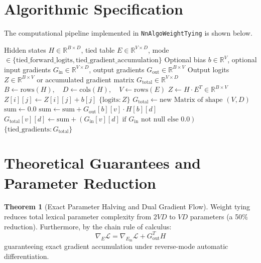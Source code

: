 \documentclass[11pt,a4paper]{article}
\theoremstyle{definition}
\newtheorem{theorem}{Theorem}[section]
\begin{document}
\section{Algorithmic Specification}

The computational pipeline implemented in \texttt{NnAlgoWeightTying} is shown below.

\begin{algorithm}[H]
\caption{Weight Tying Forward Projection and Tied Gradient Accumulation}
\begin{algorithmic}[1]
\Require Hidden states $H \in \mathbb{R}^{B \times D}$, tied table $E \in \mathbb{R}^{V \times D}$, mode $\in \{\text{tied\_forward\_logits}, \text{tied\_gradient\_accumulation}\}$
\Require Optional bias $b \in \mathbb{R}^V$, optional input gradients $G_{\text{in}} \in \mathbb{R}^{V \times D}$, output gradients $G_{\text{out}} \in \mathbb{R}^{B \times V}$
\Ensure Output logits $Z \in \mathbb{R}^{B \times V}$ or accumulated gradient matrix $G_{\text{total}} \in \mathbb{R}^{V \times D}$
\State $B \gets \text{rows}(H), \quad D \gets \text{cols}(H), \quad V \gets \text{rows}(E)$
    \State $Z \gets H \cdot E^T \in \mathbb{R}^{B \times V}$
                \State $Z[i][j] \gets Z[i][j] + b[j]$
            \EndFor
        \EndFor
    \EndIf
    \State \Return $\{\text{logits}: Z\}$
\Else
    \State $G_{\text{total}} \gets \text{new Matrix of shape } (V, D)$
            \State $\text{sum} \gets 0.0$
                \State $\text{sum} \gets \text{sum} + G_{\text{out}}[b][v] \cdot H[b][d]$
            \EndFor
            \State $G_{\text{total}}[v][d] \gets \text{sum} + (G_{\text{in}}[v][d] \text{ if } G_{\text{in}} \text{ not null else } 0.0)$
        \EndFor
    \EndFor
    \State \Return $\{\text{tied\_gradients}: G_{\text{total}}\}$
\EndIf
\end{algorithmic}
\end{algorithm}

\section{Theoretical Guarantees and Parameter Reduction}

\begin{theorem}[Exact Parameter Halving and Dual Gradient Flow]
Weight tying reduces total lexical parameter complexity from $2 V D$ to $V D$ parameters (a 50\% reduction). Furthermore, by the chain rule of calculus:
\begin{equation}
\nabla_E \mathcal{L} = \nabla_{E_{\text{in}}} \mathcal{L} + G_{\text{out}}^T H
\end{equation}
guaranteeing exact gradient accumulation under reverse-mode automatic differentiation.
\end{theorem}
\end{document}
